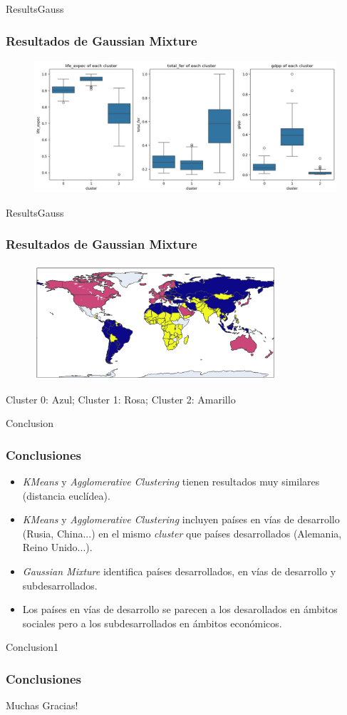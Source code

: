 \documentclass{beamer}
\begin{document}
\begin{frame}{ResultsGauss}
  \frametitle{Resultados de Gaussian Mixture}
  \begin{figure}
    \includegraphics[width=\textwidth]{../images/gaussian/features-dist-3.jpg}
  \end{figure}
\end{frame}

\begin{frame}{ResultsGauss}
  \frametitle{Resultados de Gaussian Mixture}
  \centering
  \begin{figure}
    \includegraphics[width=0.8\textwidth]{../images/gaussian/map-cropped.png}
  \end{figure}
  Cluster 0: Azul; Cluster 1: Rosa; Cluster 2: Amarillo
\end{frame}

\begin{frame}{Conclusion}
  \frametitle{Conclusiones}
  \begin{itemize}
    \item \textit{KMeans} y \textit{Agglomerative Clustering} tienen resultados muy similares (distancia euclídea).
    \pause
    \item \textit{KMeans} y \textit{Agglomerative Clustering} incluyen países en vías de desarrollo (Rusia, China...) en el mismo \textit{cluster} que países desarrollados (Alemania, Reino Unido...).
    \pause
    \item \textit{Gaussian Mixture} identifica países desarrollados, en vías de desarrollo y subdesarrollados.
    \pause
    \item Los países en vías de desarrollo se parecen a los desarollados en ámbitos sociales pero a los subdesarrollados en ámbitos económicos.
  \end{itemize}
\end{frame}

\begin{frame}{Conclusion1}
  \frametitle{Conclusiones}
  \centering
  Muchas Gracias!
\end{frame}
\end{document}
